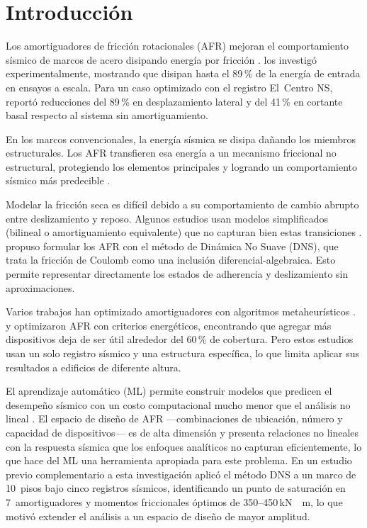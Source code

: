 \documentclass[preprint,12pt,authoryear]{elsarticle}
\newcommand{\KM}{\,\si{kN{\cdot}m}}
\begin{document}
\section{Introducción}
\label{sec:intro}

Los amortiguadores de fricción rotacionales (AFR) mejoran el comportamiento
sísmico de marcos de acero disipando energía por fricción
\citep{pall_friction_1980, pall_response_1982, jaisee_state---art_2021}.
\citet{Mualla2002} los investigó experimentalmente, mostrando que disipan
hasta el 89\,\% de la energía de entrada en ensayos a escala. Para un caso
optimizado con el registro El~Centro NS, reportó reducciones del 89\,\% en
desplazamiento lateral y del 41\,\% en cortante basal respecto al sistema
sin amortiguamiento.

En los marcos convencionales, la energía sísmica se disipa dañando los
miembros estructurales. Los AFR transfieren esa energía a un mecanismo
friccional no estructural, protegiendo los elementos principales y logrando
un comportamiento sísmico más predecible \citep{de_domenico_editorial_2020}.

Modelar la fricción seca es difícil debido a su comportamiento de cambio 
abrupto entre deslizamiento y reposo. Algunos estudios usan modelos
simplificados (bilineal o amortiguamiento equivalente) que no capturan bien
estas transiciones \citep{lee_seismic_2025, Jarrahi2020jbe}.
\citet{Namorado2024} propuso formular los AFR con el método de Dinámica No
Suave (DNS), que trata la fricción de Coulomb como una inclusión
diferencial-algebraica. Esto permite representar directamente los estados de
adherencia y deslizamiento sin aproximaciones.

Varios trabajos han optimizado amortiguadores con algoritmos metaheurísticos
\citep{moreschi_design_2003, moghaddam_optimal_2022, miguel_simultaneous_2016,
ontiveros-perez_reliability-based_2019}. \citet{Jarrahi2020jbe} y
\citet{Jarrahi2020sdee} optimizaron AFR con criterios energéticos, encontrando
que agregar más dispositivos deja de ser útil alrededor del 60\,\% de
cobertura. Pero estos estudios usan un solo registro sísmico y una estructura
específica, lo que limita aplicar sus resultados a edificios de diferente
altura.

El aprendizaje automático (ML) permite construir modelos que predicen el
desempeño sísmico con un costo computacional mucho menor que el análisis no
lineal \citep{Kazemi2022}. El espacio de diseño de AFR ---combinaciones de
ubicación, número y capacidad de dispositivos--- es de alta dimensión y
presenta relaciones no lineales con la respuesta sísmica que los enfoques
analíticos no capturan eficientemente, lo que hace del ML una herramienta
apropiada para este problema. En un estudio previo complementario a esta investigación
\citep{Ponce2026} aplicó el método DNS a un marco de 10~pisos bajo cinco
registros sísmicos, identificando un punto de saturación en 7~amortiguadores
y momentos friccionales óptimos de 350--450\KM, lo que motivó extender el
análisis a un espacio de diseño de mayor amplitud.
\end{document}
